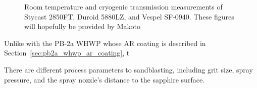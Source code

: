 \begin{figure}
    \caption[Room temperature and cryogenic transmission measurements of Stycast 2850FT, Duroid 5880LZ, and Vespel SF-0940]{Room temperature and cryogenic transmission measurements of Stycast 2850FT, Duroid 5880LZ, and Vespel SF-0940. These figures will hopefully be provided by Makoto}
    \label{fig:ar_layers}
\end{figure}

Unlike with the PB-2a WHWP whose AR coating is described in Section~\ref{sec:pb2a_whwp_ar_coating}, t

There are different process parameters to sandblasting, including grit size, spray pressure, and the spray nozzle's distance to the sapphire surface. 